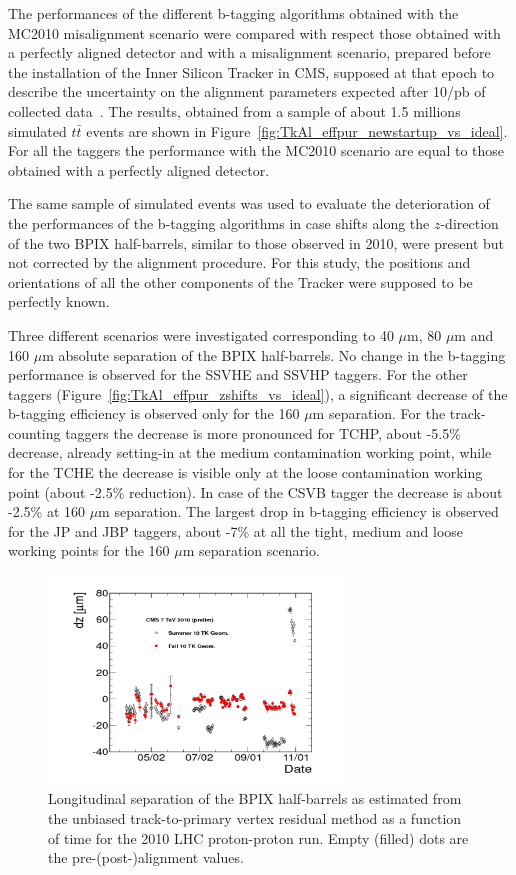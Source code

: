 The performances of the different b-tagging algorithms obtained with
the MC2010 misalignment scenario were compared with respect those
obtained with a perfectly aligned detector and with a misalignment
scenario, prepared before the installation of the Inner Silicon Tracker
in CMS, supposed at that epoch to describe the uncertainty on the
alignment parameters expected after 10/pb of collected data~\cite{CMS_NOTE_2008-29}.
The results, obtained from a sample of about 1.5 millions simulated
$t\bar{t}$ events are shown in Figure~\ref{fig:TkAl_effpur_newstartup_vs_ideal}.
For all the taggers the performance with the MC2010 scenario are equal
to those obtained with a perfectly aligned detector.

The same sample of simulated events was used to evaluate the deterioration of the
performances of the b-tagging algorithms in case shifts along the
$z$-direction of the two BPIX half-barrels, similar to those observed
in 2010, were present but not corrected by the alignment procedure.
For this study, the positions and orientations of all the other components of the Tracker 
were supposed to be perfectly known.

Three different scenarios  were investigated
corresponding to 40 $\mu$m, 80 $\mu$m and 160 $\mu$m absolute separation of the
BPIX half-barrels. 
No change in the b-tagging performance is observed for the SSVHE
and SSVHP taggers. For the other taggers
(Figure~\ref{fig:TkAl_effpur_zshifts_vs_ideal}), a significant decrease
of the b-tagging efficiency  is observed only for the 160 $\mu$m separation.
For the track-counting taggers the decrease is more pronounced for 
TCHP, about -5.5\% decrease, already setting-in at the medium
contamination working point, while for the TCHE the decrease is visible
only at the loose contamination working point (about -2.5\% reduction).
In case of the CSVB tagger the decrease is about -2.5\% at 160 $\mu$m separation. 
The largest drop in b-tagging efficiency is observed for the JP and JBP taggers, about -7\%   
at all the tight, medium and loose working points
for the 160 $\mu$m separation scenario.

 

\begin{figure}[!h]
  \centering
    \includegraphics[width=0.7\textwidth]{figures/TkAl_PV}
    \caption{Longitudinal separation of the BPIX half-barrels as
      estimated from the unbiased track-to-primary vertex residual
      method as a function of time for the 2010 LHC proton-proton
      run. Empty (filled) dots are the pre-(post-)alignment values.}
    \label{fig:TkAl_PV}
\end{figure}

